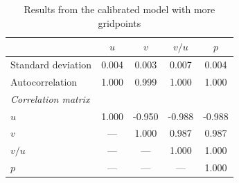\begin{table}[H]
\centering
\caption{Results from the calibrated model with more gridpoints}
\begin{tabular}{lcccc}
\toprule
 & $u$ & $v$ & $v/u$ & $p$ \\
\midrule
Standard deviation        &  0.004 &  0.003 &  0.007 &  0.004 \\
Autocorrelation           &  1.000 &  0.999 &  1.000 &  1.000 \\
\midrule
\multicolumn{5}{l}{\textit{Correlation matrix}} \\
$u$   &  1.000 & -0.950 & -0.988 & -0.988 \\
$v$   &   ---  &  1.000 &  0.987 &  0.987 \\
$v/u$ &   ---  &   ---  &  1.000 &  1.000 \\
$p$   &   ---  &   ---  &   ---  &  1.000 \\
\bottomrule
\end{tabular}
\end{table}

